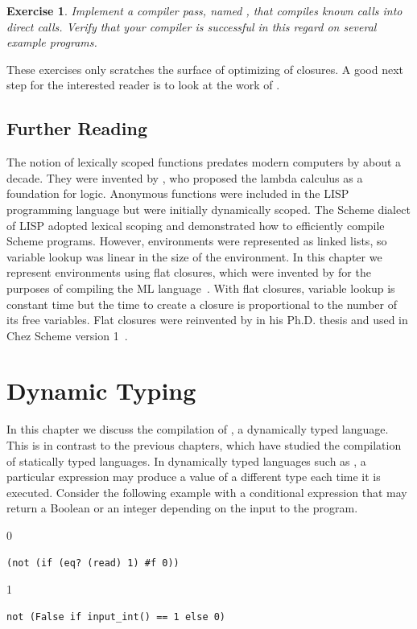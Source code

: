 \documentclass[7x10,nocrop]{TimesAPriori_MIT}%
\def\racketEd{0}
\def\pythonEd{1}
\def\edition{1}
\newtheorem{exercise}[theorem]{Exercise}
\begin{document}
\begin{exercise}\normalfont
Implement a compiler pass, named , that
compiles known calls into direct calls. Verify that your compiler is
successful in this regard on several example programs.
\end{exercise}

These exercises only scratches the surface of optimizing of
closures. A good next step for the interested reader is to look at the
work of \citet{Keep:2012ab}.

\section{Further Reading}

The notion of lexically scoped functions predates modern computers by
about a decade. They were invented by \citet{Church:1932aa}, who
proposed the lambda calculus as a foundation for logic. Anonymous
functions were included in the LISP~\citep{McCarthy:1960dz}
programming language but were initially dynamically scoped. The Scheme
dialect of LISP adopted lexical scoping and
\citet{Guy-L.-Steele:1978yq} demonstrated how to efficiently compile
Scheme programs. However, environments were represented as linked
lists, so variable lookup was linear in the size of the
environment. In this chapter we represent environments using flat
closures, which were invented by
\citet{Cardelli:1983aa,Cardelli:1984aa} for the purposes of compiling
the ML language~\citep{Gordon:1978aa,Milner:1990fk}. With flat
closures, variable lookup is constant time but the time to create a
closure is proportional to the number of its free variables.  Flat
closures were reinvented by \citet{Dybvig:1987ab} in his Ph.D. thesis
and used in Chez Scheme version 1~\citep{Dybvig:2006aa}.


\chapter{Dynamic Typing}
\label{ch:Ldyn}

In this chapter we discuss the compilation of \LangDyn{}, a
dynamically typed language. This is in contrast to the previous
chapters, which have studied the compilation of statically typed
languages. In dynamically typed languages such as \LangDyn{}, a
particular expression may produce a value of a different type each
time it is executed. Consider the following example with a conditional
 expression that may return a Boolean or an integer depending
on the input to the program.
{\if\edition\racketEd
\begin{lstlisting}
(not (if (eq? (read) 1) #f 0))
\end{lstlisting}
\fi}
{\if\edition\pythonEd
\begin{lstlisting}
not (False if input_int() == 1 else 0)
\end{lstlisting}
\fi}
\end{document}
